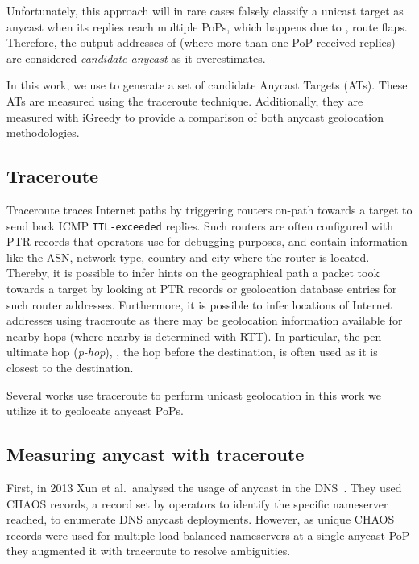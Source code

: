 Unfortunately, this approach will in rare cases falsely classify a unicast target as anycast when its replies reach multiple PoPs, which happens due to \eg, route flaps.
Therefore, the output addresses of \manycasttwo (where more than one PoP received replies) are considered \textit{candidate anycast} as it overestimates.


In this work, we use \manycasttwo to generate a set of candidate Anycast Targets (ATs).
These ATs are measured using the traceroute technique.
Additionally, they are measured with iGreedy to provide a comparison of both anycast geolocation methodologies.

\subsection{Traceroute}
% 
Traceroute traces Internet paths by triggering routers on-path towards a target to send back ICMP \texttt{TTL-exceeded} replies.
Such routers are often configured with PTR records that operators use for debugging purposes,
and contain information like the ASN, network type, country and city where the router is located. %
Thereby, it is possible to infer hints on the geographical path a packet took towards a target by looking at PTR records or geolocation database entries for such router addresses.
Furthermore, it is possible to infer locations of Internet addresses using traceroute as there may be geolocation information available for nearby hops (where nearby is determined with RTT).
In particular, the pen-ultimate hop (\textit{p-hop}), \ie, the hop before the destination, is often used as it is closest to the destination.

Several works use traceroute to perform unicast geolocation %
in this work we utilize it to geolocate anycast PoPs.

\subsection{Measuring anycast with traceroute}
First, in 2013 Xun et al.~analysed the usage of anycast in the DNS~\cite{chaos}.
They used CHAOS records, a record set by operators to identify the specific nameserver reached, to enumerate DNS anycast deployments.
However, as unique CHAOS records were used for multiple load-balanced nameservers at a single anycast PoP they augmented it with traceroute to resolve ambiguities.

